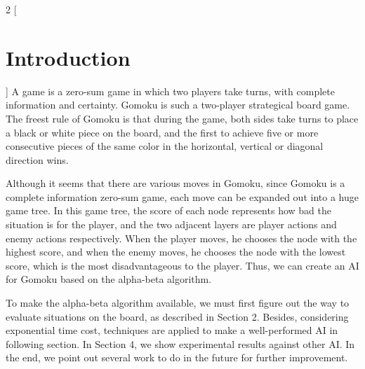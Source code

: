 \documentclass[a4paper, 12pt]{article} %
\begin{document}
\begin{multicols}{2}
    [
        \section{Introduction}
    ]
    A game is a zero-sum game in which two players take turns, with complete information and certainty. Gomoku is such a two-player strategical board game. The freest rule of Gomoku is that during the game, both sides take turns to place a black or white piece on the board, and the first to achieve five or more consecutive pieces of the same color in the horizontal, vertical or diagonal direction wins.
    
    Although it seems that there are various moves in Gomoku, since Gomoku is a complete information zero-sum game, each move can be expanded out into a huge game tree. In this game tree, the score of each node represents how bad the situation is for the player, and the two adjacent layers are player actions and enemy actions respectively. When the player moves, he chooses the node with the highest score, and when the enemy moves, he chooses the node with the lowest score, which is the most disadvantageous to the player. Thus, we can create an AI for Gomoku based on the alpha-beta algorithm.
    
    To make the alpha-beta algorithm available, we must first figure out the way to evaluate situations on the board, as described in Section 2. Besides, considering exponential time cost, techniques are applied to make a well-performed AI in following section. In Section 4, we show experimental results against other AI. In the end, we point out several work to do in the future for further improvement.
        
\end{multicols}
\end{document}
